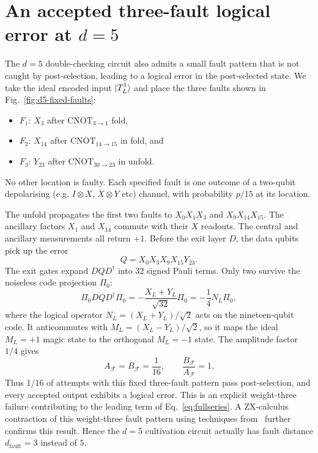 \section{An accepted three-fault logical error at $d=5$}
\label{app:d5-fault-v2}
The $d=5$ double-checking circuit also admits a small fault pattern
that is not caught by post-selection, leading to a logical error in the post-selected state. 
We take the ideal encoded input $\lvert T_L^\dagger\rangle$ and place the three faults shown in
Fig.~\ref{fig:d5-fixed-faults}:
\begin{itemize}
\item $F_1$: $X_3$ after $\text{CNOT}_{3\to1}$ fold,
\item $F_2$: $X_{14}$ after $\text{CNOT}_{14\to15}$ in fold, and
\item $F_3$: $Y_{23}$ after $\text{CNOT}_{30\to23}$ in unfold.
\end{itemize}
No other location is faulty.
Each specified fault is one outcome of a two-qubit depolarising (e.g. $I\otimes X$, $X\otimes Y$ etc)
channel, with probability $p/15$ at its location.

The unfold propagates the first two faults to $X_0X_1X_3$ and
$X_9X_{14}X_{15}$. The ancillary factors $X_1$ and $X_{14}$ commute
with their $X$ readouts. The central and ancillary measurements
all return $+1$. Before the exit layer $D$, the data qubits pick up the error
\begin{equation}
 Q=X_0X_3X_9X_{15}Y_{23}.
 \label{eq:d5-fault-frame-v2}
\end{equation}
The exit gates expand $DQD^\dagger$ into 32 signed Pauli terms.
Only two survive the noiseless code projection $\Pi_0$:
\begin{equation}
 \Pi_0DQD^\dagger\Pi_0 =-\frac{X_L+Y_L}{\sqrt{32}}\Pi_0 =-\frac14N_L\Pi_0,
 \label{eq:d5-fault-projection-v2}
\end{equation}
where the logical operator $N_L=(X_L+Y_L)/\sqrt2$ acts on the nineteen-qubit code.
It anticommutes with $M_L=(X_L-Y_L)/\sqrt2$, so it maps the ideal
$M_L=+1$ magic state to the orthogonal $M_L=-1$ state.
The amplitude factor $1/4$ gives
\begin{equation}
 A_{\mathcal F}=B_{\mathcal F}=\frac1{16},
 \qquad \frac{B_{\mathcal F}}{A_{\mathcal F}}=1.
 \label{eq:d5-fixed-fault-probabilities-v2}
\end{equation}
Thus 1/16 of attempts with this fixed three-fault pattern
pass post-selection, and every accepted output exhibits a logical error.
This is an explicit weight-three failure contributing to the leading
term of Eq.~\eqref{eq:fullseries}. A ZX-calculus contraction of this weight-three fault pattern using techniques from~\cite{wan} further confirms this result.
Hence the $d=5$ cultivation circuit actually has fault distance $d_{\text{fault}} =3$ instead of $5$.

